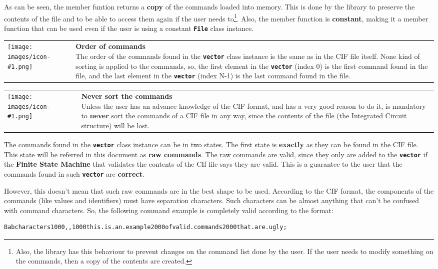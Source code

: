 \documentclass[11pt,twoside,openany,x11names,svgnames]{memoir}
\makeatletter
\newcommand{\IconNote}[3]
{
	\begin{table}[ht]
	\begin{tabular}{ lm{\dimexpr\textwidth-8\tabcolsep-\wd0}@{}}
		\toprule
		\texttt{[image: images/icon-\#1.png]}
		&
		\parbox[t]{155mm}{
		\textbf{#2} \\
		#3
		}
	\end{tabular}
\end{table}
}
\makeatother
\begin{document}
As can be seen, the member funtion returns a \textbf{copy} of the commands loaded into memory. This is done by the library to preserve the contents of the file and to be able to access them again if the user needs to\footnote{Also, the library has this behaviour to prevent changes on the command list done by the user. If the user needs to modify something on the commands, then a copy of the contents are created.}. Also, the member function is \textbf{constant}, making it a member function that can be used even if the user is using a constant \textbf{\texttt{File}} class instance.

\IconNote
	{info}
	{Order of commands}
	{The order of the commands found in the \textbf{\texttt{vector}} class instance is the same as in the CIF file itself. None kind of sorting is applied to the commands, so, the first element in the \textbf{\texttt{vector}} (index 0) is the first command found in the file, and the last element in the \textbf{\texttt{vector}} (index N-1) is the last command found in the file.}
	
\IconNote
	{error}
	{Never sort the commands}
	{Unless the user has an advance knowledge of the CIF format, and has a very good reason to do it, is mandatory to \textbf{never} sort the commands of a CIF file in any way, since the contents of the file (the Integrated Circuit structure) will be lost.}
	
The commands found in the \textbf{\texttt{vector}} class instance can be in two states. The first state is \textbf{exactly} as they can be found in the CIF file. This state will be referred in this document as \textbf{raw commands}. The raw commands are valid, since they only are added to the \textbf{\texttt{vector}} if the \textbf{Finite State Machine} that validates the contents of the CIf file says they are valid. This is a guarantee to the user that the commands found in such \textbf{\texttt{vector}} are \textbf{correct}.

However, this doesn't mean that such raw commands are in the best shape to be used. According to the CIF format, the components of the commands (like values and identifiers) must have separation characters. Such characters can be almost anything that can't be confused with command characters. So, the following command example is completely valid according to the format:

\begin{lstlisting}[frame=single,style=CPPStyle]
Babcharacters1000,,1000this.is.an.example2000ofvalid.commands2000that.are.ugly;
\end{lstlisting}
\end{document}

